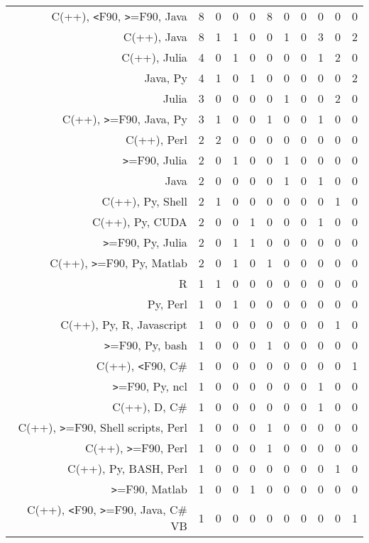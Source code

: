 {\begin{landscape}
\begin{longtable}[htb]{r|c|c|c|c|c|c|c|c|c|c}
{C(++), \verb!<!F90, \verb!>!=F90, Java} & 8 & 0 & 0 & 0 & 8 & 0 & 0 & 0 & 0 & 0 \\%
{C(++), Java} & 8 & 1 & 1 & 0 & 0 & 1 & 0 & 3 & 0 & 2 \\%
{C(++), Julia} & 4 & 0 & 1 & 0 & 0 & 0 & 0 & 1 & 2 & 0 \\%
{Java, Py} & 4 & 1 & 0 & 1 & 0 & 0 & 0 & 0 & 0 & 2 \\%
{Julia} & 3 & 0 & 0 & 0 & 0 & 1 & 0 & 0 & 2 & 0 \\%
{C(++), \verb!>!=F90, Java, Py} & 3 & 1 & 0 & 0 & 1 & 0 & 0 & 1 & 0 & 0 \\%
{C(++), Perl} & 2 & 2 & 0 & 0 & 0 & 0 & 0 & 0 & 0 & 0 \\%
{\verb!>!=F90, Julia} & 2 & 0 & 1 & 0 & 0 & 1 & 0 & 0 & 0 & 0 \\%
{Java} & 2 & 0 & 0 & 0 & 0 & 1 & 0 & 1 & 0 & 0 \\%
{C(++), Py, Shell} & 2 & 1 & 0 & 0 & 0 & 0 & 0 & 0 & 1 & 0 \\%
{C(++), Py, CUDA} & 2 & 0 & 0 & 1 & 0 & 0 & 0 & 1 & 0 & 0 \\%
{\verb!>!=F90, Py, Julia} & 2 & 0 & 1 & 1 & 0 & 0 & 0 & 0 & 0 & 0 \\%
{C(++), \verb!>!=F90, Py, Matlab} & 2 & 0 & 1 & 0 & 1 & 0 & 0 & 0 & 0 & 0 \\%
{R} & 1 & 1 & 0 & 0 & 0 & 0 & 0 & 0 & 0 & 0 \\%
{Py, Perl} & 1 & 0 & 1 & 0 & 0 & 0 & 0 & 0 & 0 & 0 \\%
{C(++), Py, R, Javascript} & 1 & 0 & 0 & 0 & 0 & 0 & 0 & 0 & 1 & 0 \\%
{\verb!>!=F90, Py, bash} & 1 & 0 & 0 & 0 & 1 & 0 & 0 & 0 & 0 & 0 \\%
{C(++), \verb!<!F90, C\#} & 1 & 0 & 0 & 0 & 0 & 0 & 0 & 0 & 0 & 1 \\%
{\verb!>!=F90, Py, ncl} & 1 & 0 & 0 & 0 & 0 & 0 & 0 & 1 & 0 & 0 \\%
{C(++), D, C\#} & 1 & 0 & 0 & 0 & 0 & 0 & 0 & 1 & 0 & 0 \\%
{C(++), \verb!>!=F90, Shell scripts, Perl} & 1 & 0 & 0 & 0 & 1 & 0 & 0 & 0 & 0 & 0 \\%
{C(++), \verb!>!=F90, Perl} & 1 & 0 & 0 & 0 & 1 & 0 & 0 & 0 & 0 & 0 \\%
{C(++), Py, BASH, Perl} & 1 & 0 & 0 & 0 & 0 & 0 & 0 & 0 & 1 & 0 \\%
{\verb!>!=F90, Matlab} & 1 & 0 & 0 & 1 & 0 & 0 & 0 & 0 & 0 & 0 \\%
{C(++), \verb!<!F90, \verb!>!=F90, Java, C\# VB} & 1 & 0 & 0 & 0 & 0 & 0 & 0 & 0 & 0 & 1 \\%

\end{longtable}
\end{landscape}}
